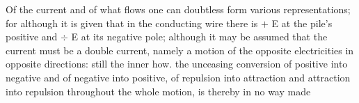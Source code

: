 \documentclass[12pt,a4paper]{book}
\begin{document}
Of the current and of what flows one can doubtless form various representations; for although it is given that in the
conducting wire there is $+$ E at the pile's positive and $\div$ E at its negative pole; although it may be assumed that
the current must be a double current, namely a motion of the opposite electricities in opposite directions: still the
inner how. the unceasing conversion of positive into negative and of negative into positive, of repulsion into attraction
and attraction into repulsion throughout the whole motion, is thereby in no way made
\end{document}
